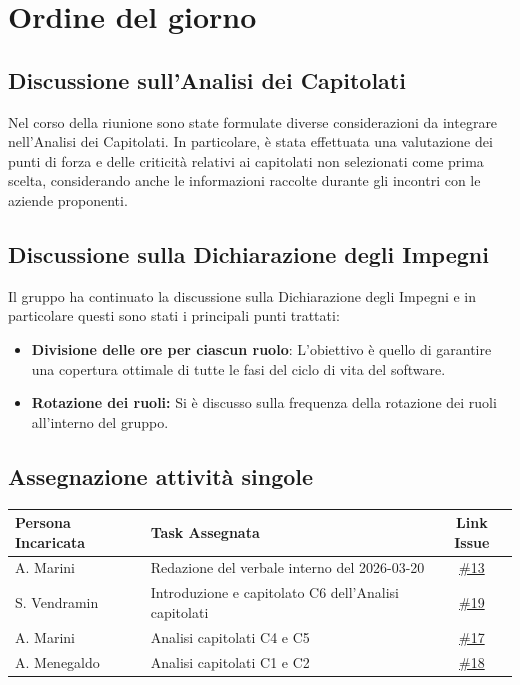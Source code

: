 \documentclass[a4paper, 10pt, colorlinks=true, linkcolor=black, urlcolor=blue, citecolor=blue, hidelinks]{article}
\newcommand{\issue}[1]{\href{https://github.com/thebitless-group-swe/thebitless.github.io/issues/#1}{\##1}}
\begin{document}
\section{Ordine del giorno}
\subsection{Discussione sull'Analisi dei Capitolati}
Nel corso della riunione sono state formulate diverse considerazioni da integrare nell'Analisi dei Capitolati. In particolare, è stata effettuata una valutazione dei punti di forza e delle criticità relativi ai capitolati non selezionati come prima scelta, considerando anche le informazioni raccolte durante gli incontri con le aziende proponenti.

\subsection{Discussione sulla Dichiarazione degli Impegni}
Il gruppo ha continuato la discussione sulla Dichiarazione degli Impegni e in particolare questi sono stati i principali punti trattati:
\begin{itemize}
    \item \textbf{Divisione delle ore per ciascun ruolo}: L'obiettivo è quello di garantire una copertura ottimale di tutte le fasi del ciclo di vita del software.
    \item \textbf{Rotazione dei ruoli:} Si è discusso sulla frequenza della rotazione dei ruoli all'interno del gruppo.
\end{itemize}

\subsection{Assegnazione attività singole}
\begin{center}
\renewcommand{\arraystretch}{1.4}
\begin{tabular}{|l|p{8cm}|c|}
\hline
\textbf{Persona Incaricata} & \textbf{Task Assegnata} & \textbf{Link Issue} \\ \hline
A. Marini & Redazione del verbale interno del 2026-03-20 & \issue{13} \\ \hline
S. Vendramin & Introduzione e capitolato C6 dell'Analisi capitolati & \issue{19} \\ \hline
A. Marini & Analisi capitolati C4 e C5 & \issue{17} \\ \hline
A. Menegaldo & Analisi capitolati C1 e C2 & \issue{18} \\ \hline
\end{tabular}
\end{center}


\appendix
\end{document}
